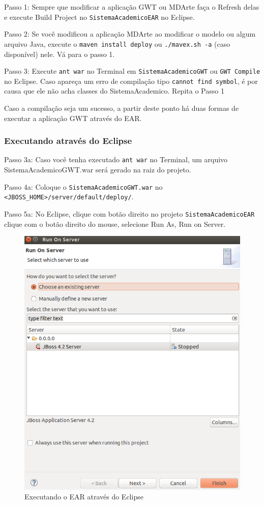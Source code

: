 Passo 1: Sempre que modificar a aplicação GWT ou MDArte faça o Refresh delas e execute Build Project no
\texttt{SistemaAcademicoEAR} no Eclipse.

Passo 2: Se você modificou a aplicação MDArte ao modificar o modelo ou algum arquivo Java, execute o \texttt{maven install deploy}
ou \texttt{./mavex.sh -a} (caso disponível) nele.
Vá para o passo 1.

Passo 3: Execute \texttt{ant war} no Terminal em \texttt{SistemaAcademicoGWT} ou \texttt{GWT Compile} no Eclipse.
Caso apareça um erro de compilação tipo \texttt{cannot find symbol}, é por causa que ele não acha classes do SistemaAcademico.
Repita o Passo 1

Caso a compilação seja um sucesso, a partir deste ponto há duas formas de executar a aplicação GWT através do EAR.

\subsubsection{Executando através do Eclipse}

Passo 3a: Caso você tenha executado \texttt{ant war} no Terminal, um arquivo SistemaAcademicoGWT.war será gerado na raiz do
projeto.

Passo 4a: Coloque o \texttt{SistemaAcademicoGWT.war} no \texttt{<JBOSS\_HOME>/server/default/deploy/}.

Passo 5a: No Eclipse, clique com botão direito no projeto \texttt{SistemaAcademicoEAR} clique com o botão direito do mouse,
selecione Run As, Run on Server.

\begin{figure}[H]
	\centering
	\includegraphics[scale=0.4]{files/imgs/gwt-13.png}
	\caption{Executando o EAR através do Eclipse}
	\label{gwt13}
\end{figure}

